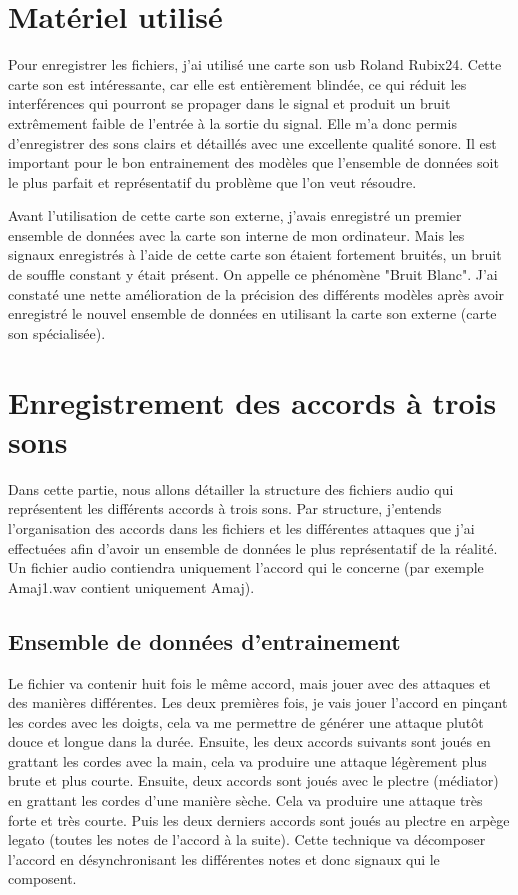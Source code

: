 \section{Matériel utilisé}
\label{sec:4.2}

Pour enregistrer les fichiers, j'ai utilisé une carte son usb Roland Rubix24. Cette carte son est intéressante, car elle est entièrement blindée, ce qui réduit les interférences qui pourront se propager dans le signal et produit un bruit extrêmement faible de l'entrée à la sortie du signal. Elle m'a donc permis d'enregistrer des sons clairs et détaillés avec une excellente qualité sonore. Il est important pour le bon entrainement des modèles que l'ensemble de données soit le plus parfait et représentatif du problème que l'on veut résoudre.

Avant l'utilisation de cette carte son externe, j'avais enregistré un premier ensemble de données avec la carte son interne de mon ordinateur. Mais les signaux enregistrés à l'aide de cette carte son étaient fortement bruités, un bruit de souffle constant y était présent. On appelle ce phénomène "Bruit Blanc". J'ai constaté une nette amélioration de la précision des différents modèles après avoir enregistré le nouvel ensemble de données en utilisant la carte son externe (carte son spécialisée).

\section{Enregistrement des accords à trois sons}
\label{sec:4.3}

Dans cette partie, nous allons détailler la structure des fichiers audio qui représentent les différents accords à trois sons. Par structure, j'entends l'organisation des accords dans les fichiers et les différentes attaques que j'ai effectuées afin d'avoir un ensemble de données le plus représentatif de la réalité. Un fichier audio contiendra uniquement l'accord qui le concerne (par exemple Amaj1.wav contient uniquement Amaj).

\subsection{Ensemble de données d'entrainement}
\label{sec:4.4}

Le fichier va contenir huit fois le même accord, mais jouer avec des attaques et des manières différentes. Les deux premières fois, je vais jouer l'accord en pinçant les cordes avec les doigts, cela va me permettre de générer une attaque plutôt douce et longue dans la durée. Ensuite, les deux accords suivants sont joués en grattant les cordes avec la main, cela va produire une attaque légèrement plus brute et plus courte. Ensuite, deux accords sont joués avec le plectre (médiator) en grattant les cordes d'une manière sèche. Cela va produire une attaque très forte et très courte. Puis les deux derniers accords sont joués au plectre en arpège legato (toutes les notes de l'accord à la suite). Cette technique va décomposer l'accord en désynchronisant les différentes notes et donc signaux qui le composent.

